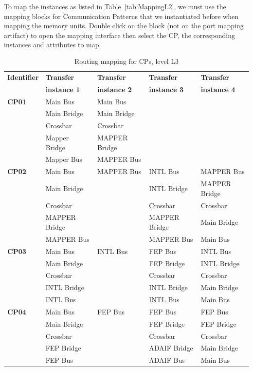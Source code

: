 \documentclass{llncs}
\begin{document}
%
To map the instances as listed in Table~\ref{tab:MappingL2}, we must use the mapping blocks for Communication Patterns
that we instantiated before when mapping the memory units. Double click on the block (not on the port mapping artifact)
to open the mapping interface then select the CP, the corresponding instances and attributes to map.
%
\begin{table}
\centering
\caption{Routing mapping for CPs, level L3}
\label{tab:MappingL3}
\begin{tabular}{| >{\centering\arraybackslash}l | >{\centering\arraybackslash}l | >{\centering\arraybackslash}l |
>{\centering\arraybackslash}l | >{\centering\arraybackslash}l |}
	\hline
		\textbf{Identifier}	& \textbf{Transfer} & \textbf{Transfer} & \textbf{Transfer} & \textbf{Transfer} \\
											&	\textbf{instance 1} & \textbf{instance 2} & \textbf{instance 3} & \textbf{instance 4} \\ \hline
		\textbf{CP01}	& Main Bus 			& Main Bus 			& 							& \\
									& Main Bridge 	& Main Bridge		& 							& \\
									& Crossbar 			& Crossbar 			& 							& \\
									& Mapper Bridge & MAPPER Bridge & 							& \\
									& Mapper Bus 		& MAPPER Bus		&  							& \\ \hline
		\textbf{CP02}	& Main Bus 				& MAPPER Bus 			& INTL Bus				& MAPPER Bus \\
									& Main Bridge 		& 					 			& INTL Bridge 		& MAPPER Bridge \\
									& Crossbar 				& 								& Crossbar				& Crossbar \\
									& MAPPER Bridge 	& 					 			& MAPPER Bridge 	& Main Bridge \\
									& MAPPER Bus 			& 				 				& MAPPER Bus 			& Main Bus \\ \hline
		\textbf{CP03}	& Main Bus 			& INTL Bus 	 		& FEP Bus  			& INTL Bus \\
									& Main Bridge 	& 							& FEP Bridge  	& INTL Bridge \\
									& Crossbar 			& 							& Crossbar  		& Crossbar \\
									& INTL Bridge 	& 							& INTL Bridge	& Main Bridge \\
									& INTL Bus 			& 							& INTL Bus			& Main Bus \\ \hline
		\textbf{CP04}	& Main Bus 			& FEP Bus 	 		& FEP Bus  			& FEP Bus \\
									& Main Bridge 	& 							& FEP Bridge  	& FEP Bridge \\
									& Crossbar 			& 							& Crossbar  		& Crossbar \\
									& FEP Bridge 		& 							& ADAIF Bridge	& Main Bridge \\
									& FEP Bus 			& 							& ADAIF Bus			& Main Bus \\ \hline
\end{tabular}
\end{table}
\end{document}
